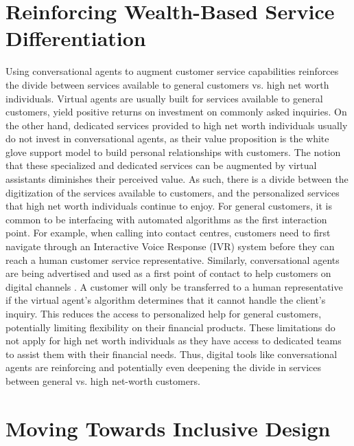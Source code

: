 \documentclass{sigchi-ext}
\begin{document}
\section{Reinforcing Wealth-Based Service Differentiation}

Using conversational agents to augment customer service capabilities reinforces the divide between services available to general customers vs. high net worth individuals. Virtual agents are usually built for services available to general customers, yield positive returns on investment on commonly asked inquiries. On the other hand, dedicated services provided to high net worth individuals usually do not invest in conversational agents, as their value proposition is the white glove support model to build personal relationships with customers. The notion that these specialized and dedicated services can be augmented by virtual assistants diminishes their perceived value. As such, there is a divide between the digitization of the services available to customers, and the personalized services that high net worth individuals continue to enjoy. For general customers, it is common to be interfacing with automated algorithms as the first interaction point. For example, when calling into contact centres, customers need to first navigate through an Interactive Voice Response (IVR) system before they can reach a human customer service representative. Similarly, conversational agents are being advertised and used as a first point of contact to help customers on digital channels \cite{revechat}. A customer will only be transferred to a human representative if the virtual agent's algorithm determines that it cannot handle the client's inquiry. This reduces the access to personalized help for general customers, potentially limiting flexibility on their financial products. These limitations do not apply for high net worth individuals as they have access to dedicated teams to assist them with their financial needs. Thus, digital tools like conversational agents are reinforcing and potentially even deepening the divide in services between general vs. high net-worth customers.


\section{Moving Towards Inclusive Design}
\end{document}
